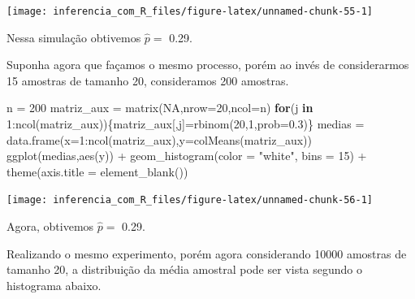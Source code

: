 \documentclass[
]{book}
\newenvironment{Shaded}{\begin{snugshade}}{\end{snugshade}}
\newcommand{\AttributeTok}[1]{\textcolor[rgb]{0.77,0.63,0.00}{#1}}
\newcommand{\ConstantTok}[1]{\textcolor[rgb]{0.00,0.00,0.00}{#1}}
\newcommand{\ControlFlowTok}[1]{\textcolor[rgb]{0.13,0.29,0.53}{\textbf{#1}}}
\newcommand{\DecValTok}[1]{\textcolor[rgb]{0.00,0.00,0.81}{#1}}
\newcommand{\FloatTok}[1]{\textcolor[rgb]{0.00,0.00,0.81}{#1}}
\newcommand{\FunctionTok}[1]{\textcolor[rgb]{0.00,0.00,0.00}{#1}}
\newcommand{\NormalTok}[1]{#1}
\newcommand{\OtherTok}[1]{\textcolor[rgb]{0.56,0.35,0.01}{#1}}
\newcommand{\SpecialCharTok}[1]{\textcolor[rgb]{0.00,0.00,0.00}{#1}}
\newcommand{\StringTok}[1]{\textcolor[rgb]{0.31,0.60,0.02}{#1}}
\begin{document}
\begin{center}\texttt{[image: inferencia\_com\_R\_files/figure-latex/unnamed-chunk-55-1]} \end{center}

Nessa simulação obtivemos \(\hat p =\) 0.29.

Suponha agora que façamos o mesmo processo, porém ao invés de considerarmos 15 amostras de tamanho 20, consideramos 200 amostras.

\begin{Shaded}
\begin{Highlighting}[]
\NormalTok{n }\OtherTok{=} \DecValTok{200}
\NormalTok{matriz\_aux }\OtherTok{=} \FunctionTok{matrix}\NormalTok{(}\ConstantTok{NA}\NormalTok{,}\AttributeTok{nrow=}\DecValTok{20}\NormalTok{,}\AttributeTok{ncol=}\NormalTok{n)}
\ControlFlowTok{for}\NormalTok{(j }\ControlFlowTok{in} \DecValTok{1}\SpecialCharTok{:}\FunctionTok{ncol}\NormalTok{(matriz\_aux))\{matriz\_aux[,j]}\OtherTok{=}\FunctionTok{rbinom}\NormalTok{(}\DecValTok{20}\NormalTok{,}\DecValTok{1}\NormalTok{,}\AttributeTok{prob=}\FloatTok{0.3}\NormalTok{)\}}
\NormalTok{medias }\OtherTok{=} \FunctionTok{data.frame}\NormalTok{(}\AttributeTok{x=}\DecValTok{1}\SpecialCharTok{:}\FunctionTok{ncol}\NormalTok{(matriz\_aux),}\AttributeTok{y=}\FunctionTok{colMeans}\NormalTok{(matriz\_aux))}
\FunctionTok{ggplot}\NormalTok{(medias,}\FunctionTok{aes}\NormalTok{(y)) }\SpecialCharTok{+}
  \FunctionTok{geom\_histogram}\NormalTok{(}\AttributeTok{color =} \StringTok{"white"}\NormalTok{, }\AttributeTok{bins =} \DecValTok{15}\NormalTok{) }\SpecialCharTok{+}
  \FunctionTok{theme}\NormalTok{(}\AttributeTok{axis.title =} \FunctionTok{element\_blank}\NormalTok{())}
\end{Highlighting}
\end{Shaded}

\begin{center}\texttt{[image: inferencia\_com\_R\_files/figure-latex/unnamed-chunk-56-1]} \end{center}

Agora, obtivemos \(\hat p =\) 0.29.

Realizando o mesmo experimento, porém agora considerando 10000 amostras de tamanho 20, a distribuição da média amostral pode ser vista segundo o histograma abaixo.
\end{document}
